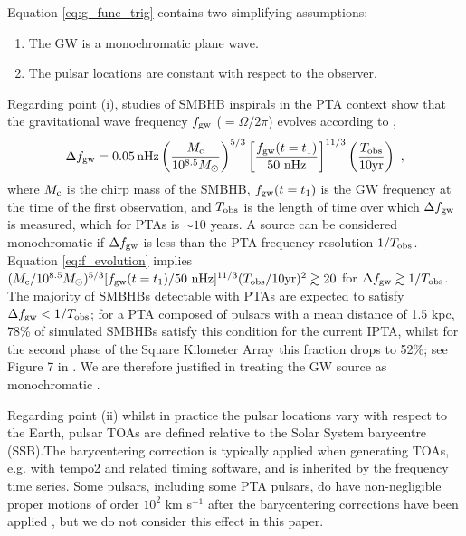 \documentclass[fleqn,usenatbib,useAMS]{mnras}
\begin{document}
\noindent Equation \eqref{eq:g_func_trig} contains two simplifying assumptions: 
\begin{enumerate}[leftmargin=2em]
	\item The GW is a monochromatic plane wave.
	\item The pulsar locations are constant with respect to the observer.
\end{enumerate}
Regarding point (i), studies of SMBHB inspirals in the PTA context show that the gravitational wave frequency $f_{\rm gw}$ ($=\Omega / 2 \pi $) evolves according to \citep[e.g.][]{Sesana2010},
\begin{equation}
	\Delta f_{\rm gw} = 0.05 \, \mathrm{nHz}\left(\frac{M_{\rm c}}{10^{8.5} M_{\odot}}\right)^{5 / 3}\left[\frac{f_{\rm gw}(t=t_1)}{50 \mathrm{~nHz}}\right]^{11 / 3}\left(\frac{T_{\mathrm{obs}}}{10 \mathrm{yr}}\right) \ ,
	\label{eq:f_evolution}
\end{equation}
where $M_{\rm c}$ is the chirp mass of the SMBHB, $f_{\rm gw}(t=t_1)$ is the GW frequency at the time of the first observation, and $T_{\rm obs}$ is the length of time over which $\Delta f_{\rm gw}$ is measured, which for PTAs is $\sim 10$ years. A source can be considered monochromatic if $\Delta f_{\rm gw}$ is less than the PTA frequency resolution $1/T_{\rm obs}$. Equation \eqref{eq:f_evolution} implies $(M_{\rm c}/10^{8.5} M_{\odot})^{5/3} [ f_{\rm gw}(t=t_1) / 50 \mathrm{~nHz}]^{11/3} (T_{\rm obs}/10 \mathrm{yr})^2 \gtrsim 20$ for $\Delta f_{\rm gw} \gtrsim 1/T_{\rm obs}$. The majority of SMBHBs detectable with PTAs are expected to satisfy $\Delta f_{\rm gw} < 1/T_{\rm obs}$; for a PTA composed of pulsars with a mean distance of 1.5 kpc, 78\% of simulated SMBHBs satisfy this condition for the current IPTA, whilst for the second phase of the Square Kilometer Array this fraction drops to 52\%; see Figure 7 in  \cite{Rosado10.1093/mnras/stv1098}. We are therefore justified in treating the GW source as monochromatic \citep{Sesana10,Sesana2010,Ellis2012ApJ}. \newline 


Regarding point (ii) whilst in practice the pulsar locations vary with respect to the Earth, pulsar TOAs are defined relative to the Solar System barycentre (SSB).The barycentering correction is typically applied when generating TOAs, e.g. with {\sc tempo2} \citep{tempo2} and related timing software, and is inherited by the frequency time series. Some pulsars, including some PTA pulsars, do have non-negligible proper motions of order $10^2$ km s$^{-1}$ after the barycentering corrections have been applied \citep[e.g.][]{10.1093/mnras/sty3390}, but we do not consider this effect in this paper. 
\end{document}
